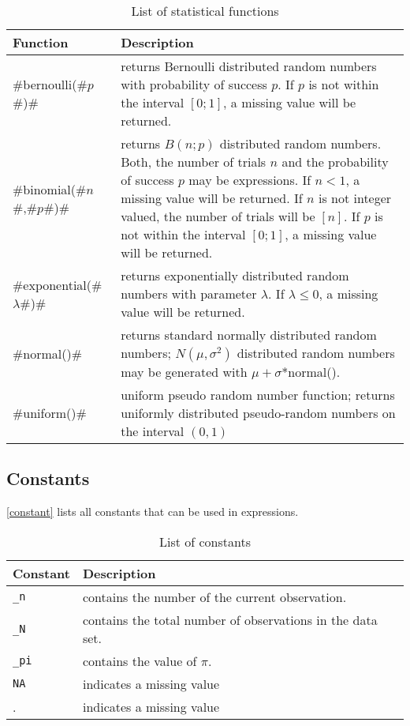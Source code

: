\begin{table}[ht]
\begin{center}
\begin{tabular}{|l|p{11cm}|}
\hline
{\bf Function} & {\bf Description} \\
 \hline \hline
 #bernoulli(#$p$#)# & returns Bernoulli distributed
 random numbers with probability of success $p$. If $p$ is not
 within the interval $[0;1]$, a
 missing value will be returned. \\
 \hline
 #binomial(#$n$#,#$p$#)# & returns $B(n;p)$ distributed random
 numbers. Both, the number of trials $n$ and the probability of
 success $p$ may be expressions. If $n < 1$, a missing value will
 be returned. If $n$ is not integer valued, the number of trials
 will be $[n]$. If $p$ is not within the interval $[0;1]$, a
 missing value will be returned. \\
 \hline
 #exponential(#$\lambda$#)# & returns exponentially distributed
 random numbers with parameter $\lambda$.
 If $\lambda \leq 0$, a missing value will be returned. \\
 \hline
 #normal()# & returns standard normally distributed random
 numbers;
 $N(\mu,\sigma^2)$ distributed random numbers may be generated with $\mu + \sigma$*normal(). \\
 \hline
 #uniform()# & uniform
 pseudo random number function; returns uniformly distributed
 pseudo-random numbers on the interval $(0,1)$ \\
 \hline
\end{tabular}
{\em \caption{\label{statfunc} List of statistical functions}}
\end{center}
\end{table}


\subsection{Constants}
 
 \index{$\pi$} 

\autoref{constant} lists all constants that can be used in
expressions.


\begin{table}[ht]
\begin{center}
\begin{tabular}{|l|l|}
\hline
Constant & Description \\
\hline \hline
\texttt{\_n} & contains the number of the current observation.  \\
\texttt{\_N }& contains the total number of observations in the data set. \\
\texttt{\_pi} & contains the value of $\pi$. \\
\texttt{NA} & indicates a missing value \\
.  & indicates a missing value \\

\hline
\end{tabular}
{\em \caption{\label{constant} List of constants}}
\end{center}
\end{table}


